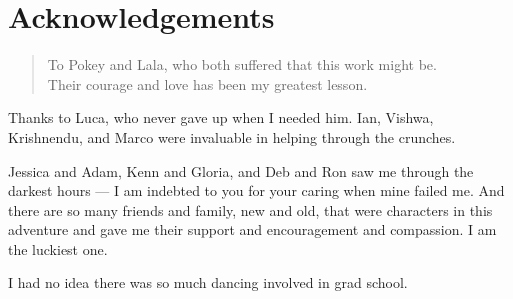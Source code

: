 \chapter{Acknowledgements}

\begin{quote}
To Pokey and Lala,
who both suffered that this work might be.\\
Their courage and love has been my greatest lesson.
\end{quote}

\Heart\Heart\Heart

Thanks to Luca, who never gave up when I needed him.
Ian, Vishwa, Krishnendu, and Marco were invaluable in
helping through the crunches.

Jessica and Adam, Kenn and Gloria, and Deb and Ron
saw me through the darkest hours --- I am indebted to you
for your caring when mine failed me.
And there are so many friends and family, new and old,
that were characters in this adventure and gave me their
support and encouragement and compassion.
I am the luckiest one.

I had no idea there was so much dancing involved in grad school.

